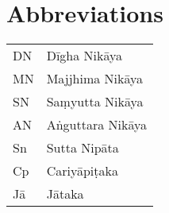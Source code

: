 \chapter*{Abbreviations}

\begin{tabular}{l l}
DN & Dīgha Nikāya\\
MN & Majjhima Nikāya\\
SN & Saṃyutta Nikāya\\
AN & Aṅguttara Nikāya\\
Sn & Sutta Nipāta\\
Cp & Cariyāpiṭaka\\
Jā & Jātaka
\end{tabular}
